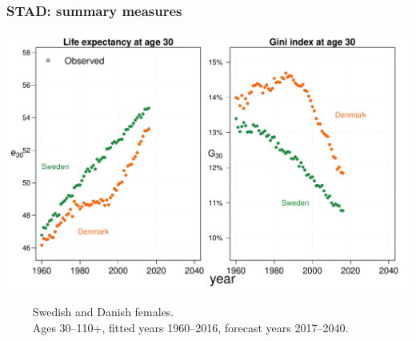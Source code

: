 \documentclass[12pt, xcolor=table]{beamer}  %
\begin{document}
\begin{frame}\frametitle{STAD: summary measures}

\vspace{-0.5cm}

	
	\begin{center}	
		\vspace{0.4cm}
		
		\includegraphics[scale=.42]{Figures/Ch2/F4_1}
		
	\end{center}

\vspace{-0.3cm}
\tiny{$\quad\quad$ Swedish and Danish females. \\ $\quad\quad$ Ages 30--110+, fitted years 1960--2016, forecast years 2017--2040.}

	
\end{frame}
\end{document}
